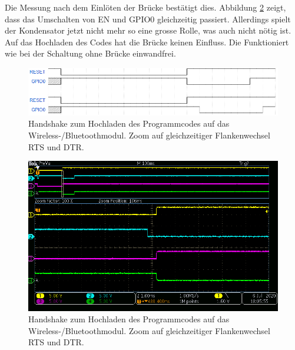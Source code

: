 Die Messung nach dem Einlöten der Brücke bestätigt dies. Abbildung \ref{fig:ESP32_RTS_DTR_EN_IO0_mit_Bruecke_1} zeigt, dass das Umschalten von EN und GPIO0 gleichzeitig passiert. Allerdings spielt der Kondensator jetzt nicht mehr so eine grosse Rolle, was auch nicht nötig ist. Auf das Hochladen des Codes hat die Brücke keinen Einfluss. Die Funktioniert wie bei der Schaltung ohne Brücke einwandfrei.


\begin{figure}[H]
\center
\includegraphics[width = \textwidth]{graphics/ESP32_Handshake_Forum}
\caption{Handshake zum Hochladen des Programmcodes auf das Wireless-/Bluetoothmodul. Zoom auf gleichzeitiger Flankenwechsel RTS und DTR. \cite{liudr_trying_2017}}
\label{fig:ESP32_Handshake_Forum}
\end{figure}

\begin{figure}[H]
\center
\includegraphics[width = \textwidth]{graphics/ESP32_RTS_DTR_EN_IO0_mit_Bruecke_1}
\caption{Handshake zum Hochladen des Programmcodes auf das Wireless-/Bluetoothmodul. Zoom auf gleichzeitiger Flankenwechsel RTS und DTR.}
\label{fig:ESP32_RTS_DTR_EN_IO0_mit_Bruecke_1}
\end{figure}
